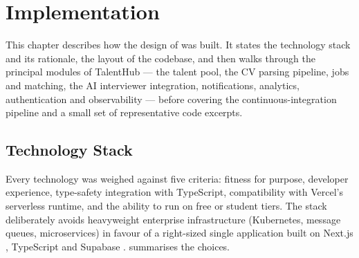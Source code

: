 ﻿\chapter{Implementation}
\label{cap:implementation}

This chapter describes how the design of  was built.
It states the technology stack and its rationale, the layout of the
codebase, and then walks through the principal modules of TalentHub --- the
talent pool, the CV parsing pipeline, jobs and matching, the AI interviewer
integration, notifications, analytics, authentication and observability ---
before covering the continuous-integration pipeline and a small set of
representative code excerpts.


\section{Technology Stack}
\label{sec:impl-stack}

Every technology was weighed against five criteria: fitness for purpose,
developer experience, type-safety integration with TypeScript, compatibility
with Vercel's serverless runtime, and the ability to run on free or student
tiers. The stack deliberately avoids heavyweight enterprise infrastructure
(Kubernetes, message queues, microservices) in favour of a right-sized
single application built on Next.js \parencite{NextjsDocs}, TypeScript
\parencite{Bierman2014TypeScript} and Supabase \parencite{SupabaseDocs}.
 summarises the choices.

